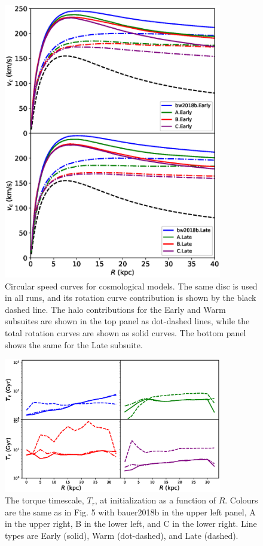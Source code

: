 \begin{figure}
	\centering
	\includegraphics[width=0.85\textwidth]{../figures/rotation_curve.eps}
	\caption{Circular speed curves for cosmological models. The
          same disc is used in all runs, and its rotation curve
          contribution is shown by the black dashed line. The halo
          contributions for the Early and Warm subsuites are shown in
          the top panel as dot-dashed lines, while the total rotation
          curves are shown as solid curves. The bottom panel shows the
          same for the Late subsuite.} \label{fig:rotation_curves_iii}
\end{figure}

\begin{figure}
	\centering
	\includegraphics[width=0.85\textwidth]{../figures/timescale.eps}\caption{The
          torque timescale, $T_\tau$, at initialization as a function of $R$.
          Colours are the same as in
          Fig. 5 with bauer2018b in the upper left panel, A in the upper right,
          B in the lower left, and C in the lower right.
          Line types are Early (solid), Warm (dot-dashed), and
          Late (dashed).} \label{fig:ratio_freqs}
\end{figure}

